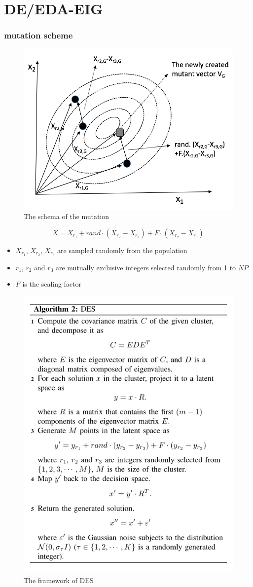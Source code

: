 \documentclass[xcolor=dvipsnames]{beamer}
\begin{document}
    \section{DE/EDA-EIG}
    \begin{frame}
    \frametitle{mutation scheme}
    \begin{figure}
    \centering
    \includegraphics[width=0.3\columnwidth]{mutation1.png}
    \caption{The schema of the mutation}
    \end{figure}
    \begin{equation}
    \label{DE}
    X=X_{r_1}+rand\cdot(X_{r_2}-X_{r_3})+F\cdot(X_{r_2}-X_{r_3})
    \end{equation}

    \begin{itemize}
    \item $X_{r_1}$, $X_{r_2}$, $X_{r_3}$ are sampled randomly from the population
    \item $r_1$, $r_2$ and $r_3$ are mutually exclusive integers selected randomly from 1 to $NP$
    \item $F$ is the scaling factor
    \end{itemize}
    \end{frame}
    \begin{figure}
    \centering
    \includegraphics[width=0.5\columnwidth]{alg2.jpg}
    \caption{The framework of DES}
    \end{figure}
\end{document}
